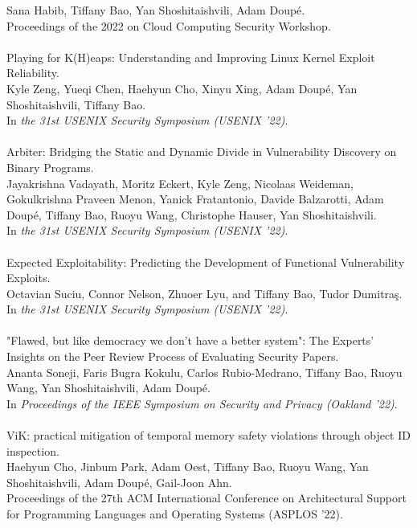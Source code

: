 Sana Habib, Tiffany Bao, Yan Shoshitaishvili, Adam Doup\'{e}. \\
Proceedings of the 2022 on Cloud Computing Security Workshop.
\\\\
Playing for K(H)eaps: Understanding and Improving Linux Kernel Exploit Reliability. \\
Kyle Zeng, Yueqi Chen, Haehyun Cho, Xinyu Xing, Adam Doup\'{e}, Yan Shoshitaishvili, Tiffany Bao. \\
In \emph{the 31st USENIX Security Symposium (USENIX '22)}.
\\\\
Arbiter: Bridging the Static and Dynamic Divide in Vulnerability Discovery on Binary Programs. \\
Jayakrishna Vadayath, Moritz Eckert, Kyle Zeng, Nicolaas Weideman, Gokulkrishna Praveen Menon, Yanick Fratantonio, Davide Balzarotti, Adam Doup\'{e}, Tiffany Bao, Ruoyu Wang, Christophe Hauser, Yan Shoshitaishvili. \\
In \emph{the 31st USENIX Security Symposium (USENIX '22)}.
\\\\
Expected Exploitability: Predicting the Development of Functional Vulnerability Exploits. \\
Octavian Suciu, Connor Nelson, Zhuoer Lyu, and Tiffany Bao, Tudor Dumitra\c{s}. \\
In \emph{the 31st USENIX Security Symposium (USENIX '22)}.
\\\\
"Flawed, but like democracy we don't have a better system": The Experts' Insights on the Peer Review Process of Evaluating Security Papers. \\
Ananta Soneji, Faris Bugra Kokulu, Carlos Rubio-Medrano, Tiffany Bao, Ruoyu Wang, Yan Shoshitaishvili, Adam Doup\'{e}.\\
In \emph{Proceedings of the IEEE Symposium on Security and Privacy (Oakland '22)}.
\\\\
ViK: practical mitigation of temporal memory safety violations through object ID inspection. \\
Haehyun Cho, Jinbum Park, Adam Oest, Tiffany Bao, Ruoyu Wang, Yan Shoshitaishvili, Adam Doup\'{e}, Gail-Joon Ahn. \\
Proceedings of the 27th ACM International Conference on Architectural Support for Programming Languages and Operating Systems (ASPLOS '22).
\\\\
